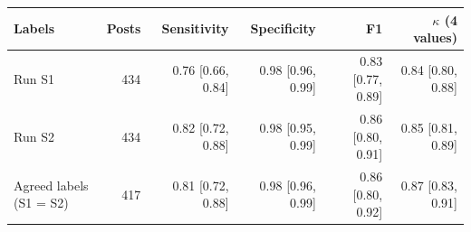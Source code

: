 \begin{tabular}{lrrrrr}
\toprule
Labels & Posts & Sensitivity & Specificity & F1 & $\kappa$ (4 values) \\
\midrule
Run S1 & 434 & 0.76 [0.66, 0.84] & 0.98 [0.96, 0.99] & 0.83 [0.77, 0.89] & 0.84 [0.80, 0.88] \\
Run S2 & 434 & 0.82 [0.72, 0.88] & 0.98 [0.95, 0.99] & 0.86 [0.80, 0.91] & 0.85 [0.81, 0.89] \\
Agreed labels (S1 = S2) & 417 & 0.81 [0.72, 0.88] & 0.98 [0.96, 0.99] & 0.86 [0.80, 0.92] & 0.87 [0.83, 0.91] \\
\bottomrule
\end{tabular}
